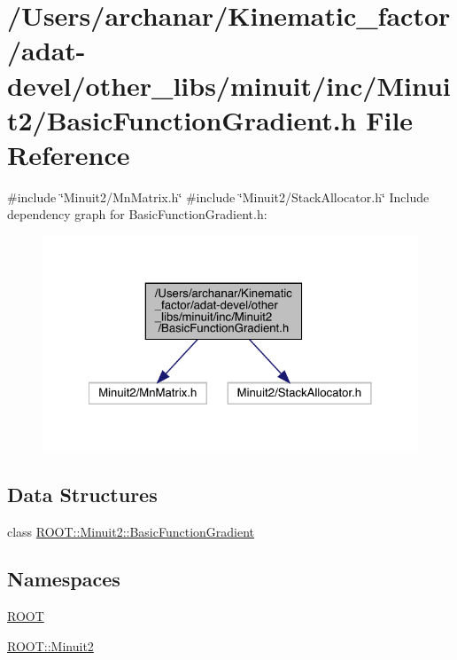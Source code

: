 \hypertarget{adat-devel_2other__libs_2minuit_2inc_2Minuit2_2BasicFunctionGradient_8h}{}\section{/\+Users/archanar/\+Kinematic\+\_\+factor/adat-\/devel/other\+\_\+libs/minuit/inc/\+Minuit2/\+Basic\+Function\+Gradient.h File Reference}
\label{adat-devel_2other__libs_2minuit_2inc_2Minuit2_2BasicFunctionGradient_8h}
{\ttfamily \#include \char`\"{}Minuit2/\+Mn\+Matrix.\+h\char`\"{}}\newline
{\ttfamily \#include \char`\"{}Minuit2/\+Stack\+Allocator.\+h\char`\"{}}\newline
Include dependency graph for Basic\+Function\+Gradient.\+h\+:
\nopagebreak
\begin{figure}[H]
\begin{center}
\leavevmode
\includegraphics[width=322pt]{dc/daa/adat-devel_2other__libs_2minuit_2inc_2Minuit2_2BasicFunctionGradient_8h__incl}
\end{center}
\end{figure}
\subsection*{Data Structures}
\begin{DoxyCompactItemize}
\item 
class \mbox{\hyperlink{classROOT_1_1Minuit2_1_1BasicFunctionGradient}{R\+O\+O\+T\+::\+Minuit2\+::\+Basic\+Function\+Gradient}}
\end{DoxyCompactItemize}
\subsection*{Namespaces}
\begin{DoxyCompactItemize}
\item 
 \mbox{\hyperlink{namespaceROOT}{R\+O\+OT}}
\item 
 \mbox{\hyperlink{namespaceROOT_1_1Minuit2}{R\+O\+O\+T\+::\+Minuit2}}
\end{DoxyCompactItemize}
